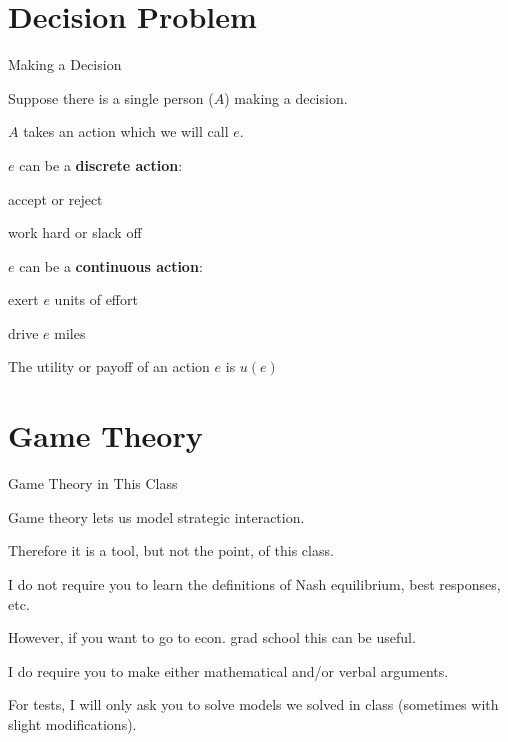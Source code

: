 \documentclass[aspectratio=169,usenames,dvipsnames]{beamer}
\newenvironment{wideitemize}{\itemize\addtolength{\itemsep}{10pt}}{\enditemize}
\begin{document}
\section{Decision Problem}

\begin{frame}{Making a Decision}

\begin{wideitemize}
    \item Suppose there is a single person ($A$) making a decision.
    \item $A$ takes an action which we will call $e$.
    \item $e$ can be a \textbf{discrete action}:
    \begin{wideitemize}
        \item accept or reject
        \item work hard or slack off
    \end{wideitemize}
    \item $e$ can be a \textbf{continuous action}:
    \begin{wideitemize}
        \item exert $e$ units of effort
        \item drive $e$ miles
    \end{wideitemize}
    \item The utility or payoff of an action $e$ is $u(e)$
    \end{wideitemize}
\end{frame}

\section{Game Theory}

\begin{frame}{Game Theory in This Class}
\begin{wideitemize}
    \item Game theory lets us model strategic interaction.
    \item Therefore it is a tool, but not the point, of this class.
    \item I do not require you to learn the definitions of Nash equilibrium, best responses, etc.
    \item However, if you want to go to econ. grad school this can be useful.
    \item I do require you to make either mathematical and/or verbal arguments.
    \item For tests, I will only ask you to solve models we solved in class (sometimes with slight modifications).
\end{wideitemize}
    
\end{frame}
\end{document}
